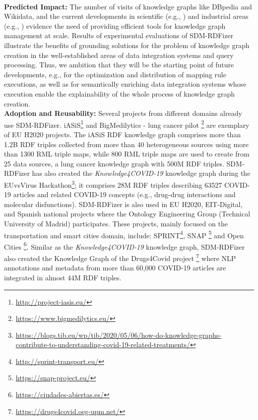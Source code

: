 \\
\textbf{Predicted Impact:}
 The number of visits of knowledge graphs like DBpedia and Wikidata, and the current developments in scientific (e.g., \citep{AuerKPKSV18}) and industrial areas (e.g., \citep{NoyGJNPT19}) evidence the need of providing efficient tools for knowledge graph management at scale. Results of experimental evaluations of SDM-RDFizer illustrate the benefits of grounding solutions for the problem of knowledge graph creation in the well-established areas of data integration systems and query processing. Thus, we ambition that they will be the starting point of future developments, e.g., for the optimization and distribution of mapping rule executions, as well as for semantically enriching data integration systems whose execution enable the explainability of the whole process of knowledge graph creation. 
 \\
\textbf{Adoption and Reusability:}
Several projects from different domains already use SDM-RDFizer.
iASiS\footnote{\url{http://project-iasis.eu/}} and BigMedilytics - lung cancer pilot \footnote{\url{https://www.bigmedilytics.eu/}} are exemplary of EU H2020 projects.
The iASiS RDF knowledge graph comprises more than 1.2B RDF triples collected from more than 40 heterogeneous sources using more than 1300 RML triple maps, while 800 RML triple maps are used to create from 25 data sources, a lung cancer knowledge graph with 500M RDF triples. SDM-RDFizer has also created the \textit{Knowledge4COVID-19} knowledge graph during the EUvsVirus Hackathon\footnote{\url{https://blogs.tib.eu/wp/tib/2020/05/06/how-do-knowledge-graphs-contribute-to-understanding-covid-19-related-treatments/}}; it comprises 28M RDF triples describing 63527 COVID-19 articles and related COVID-19 concepts (e.g., drug-drug interactions and molecular disfunctions). SDM-RDFizer is also used in EU H2020, EIT-Digital, and Spanish national projects where the Ontology Engineering Group (Technical University of Madrid) participates. These projects, mainly focused on the transportation and smart cities domain, include: SPRINT\footnote{\url{http://sprint-transport.eu/}}, SNAP \footnote{\url{https://snap-project.eu/}} and Open Cities \footnote{\url{https://ciudades-abiertas.es/}}. Similar as the \textit{Knowledge4COVID-19} knowledge graph, SDM-RDFizer also created the Knowledge Graph of the Drugs4Covid project \footnote{\url{https://drugs4covid.oeg-upm.net/}} where NLP annotations and metadata from more than 60,000 COVID-19 articles are integrated in almost 44M RDF triples.

